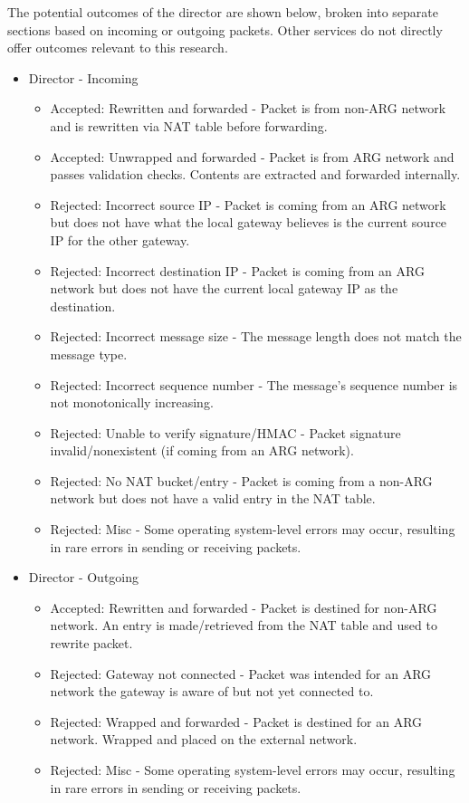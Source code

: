 \par The potential outcomes of the director are shown below, broken into separate sections based on incoming or outgoing packets. Other services do not directly offer outcomes relevant to this research.

\begin{itemize}
\item Director - Incoming
	\begin{itemize}
	\item Accepted: Rewritten and forwarded - Packet is from non-\ac{ARG} network and is rewritten via \ac{NAT} table before forwarding.
	\item Accepted: Unwrapped and forwarded - Packet is from \ac{ARG} network and passes validation checks. Contents are extracted and forwarded internally.

	\item Rejected: Incorrect source \ac{IP} - Packet is coming from an \ac{ARG} network but does not have what the local gateway believes is the current source IP for the other gateway.
	\item Rejected: Incorrect destination \ac{IP} - Packet is coming from an \ac{ARG} network but does not have the current local gateway \ac{IP} as the destination.
	\item Rejected: Incorrect message size - The message length does not match the message type.
	\item Rejected: Incorrect sequence number - The message's sequence number is not monotonically increasing. 
	\item Rejected: Unable to verify signature/\ac{HMAC} - Packet signature invalid/nonexistent (if coming from an \ac{ARG} network).
	\item Rejected: No \ac{NAT} bucket/entry - Packet is coming from a non-\ac{ARG} network but does not have a valid entry in the \ac{NAT} table.

	\item Rejected: Misc - Some operating system-level errors may occur, resulting in rare errors in sending or receiving packets.
	\end{itemize}

\item Director - Outgoing
	\begin{itemize}
	\item Accepted: Rewritten and forwarded - Packet is destined for non-\ac{ARG} network. An entry is made/retrieved from the \ac{NAT} table and used to rewrite packet.

	\item Rejected: Gateway not connected - Packet was intended for an ARG network the gateway is aware of but not yet connected to.
	\item Rejected: Wrapped and forwarded - Packet is destined for an \ac{ARG} network. Wrapped and placed on the external network.

	\item Rejected: Misc - Some operating system-level errors may occur, resulting in rare errors in sending or receiving packets.
	\end{itemize}
\end{itemize}

